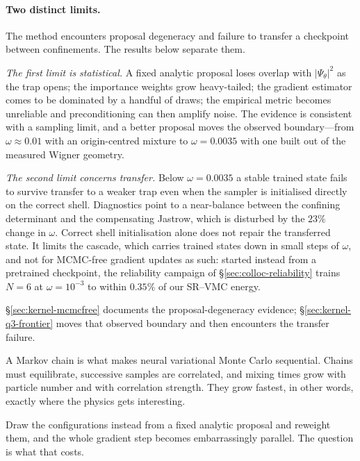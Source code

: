 \paragraph{Two distinct limits.}
The method encounters proposal degeneracy and failure to transfer a checkpoint between
confinements. The results below separate them.

\emph{The first limit is statistical.} A fixed analytic proposal loses overlap with
$|\Psi_\theta|^2$ as the trap opens; the importance weights grow heavy-tailed; the gradient
estimator comes to be dominated by a handful of draws; the empirical metric becomes
unreliable and preconditioning can then amplify noise. The evidence is consistent with a
sampling limit, and a better proposal moves the observed boundary---from $\omega\approx0.01$ with an
origin-centred mixture to $\omega=0.0035$ with one built out of the measured Wigner
geometry.

\emph{The second limit concerns transfer.} Below $\omega=0.0035$ a stable trained state fails
to survive transfer to a weaker trap even when the sampler is initialised directly on the
correct shell. Diagnostics point to a near-balance between the confining determinant and
the compensating Jastrow, which is disturbed by the $23\%$ change in $\omega$. Correct
shell initialisation alone does not repair the transferred state.
It limits the cascade, which carries trained states down in small steps of $\omega$,
and not for MCMC-free gradient updates as such: started instead from a pretrained checkpoint,
the reliability campaign of \S\ref{sec:colloc-reliability} trains $N{=}6$ at $\omega=10^{-3}$
to within $0.35\%$ of our SR--VMC energy.

\noindent \S\ref{sec:kernel-mcmcfree} documents the proposal-degeneracy evidence;
\S\ref{sec:kernel-q3-frontier} moves that observed boundary and then encounters the transfer
failure.

A Markov chain is what makes neural variational Monte Carlo sequential. Chains must
equilibrate, successive samples are correlated, and mixing times grow with particle number
and with correlation strength. They grow fastest, in other words, exactly where the physics
gets interesting.

Draw the configurations instead from a fixed analytic proposal and reweight them, and the
whole gradient step becomes embarrassingly parallel. The question is what that costs.

